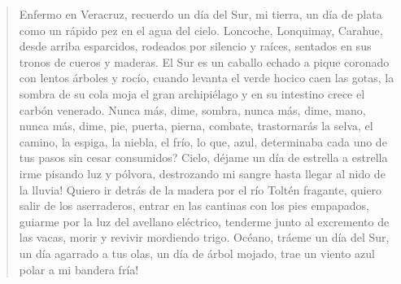 \documentclass[12pt]{article}
\begin{document}
\clearpage
{}
\begin{verse}
Enfermo en Veracruz, recuerdo un día
del Sur, mi tierra, un día de plata
como un rápido pez en el agua del cielo.
Loncoche, Lonquimay, Carahue, desde arriba
esparcidos, rodeados por silencio y raíces,
sentados en sus tronos de cueros y maderas.
El Sur es un caballo echado a pique
coronado con lentos árboles y rocío,
cuando levanta el verde hocico caen las gotas,
la sombra de su cola moja el gran archipiélago
y en su intestino crece el carbón venerado.
Nunca más, dime, sombra, nunca más, dime, mano,
nunca más, dime, pie, puerta, pierna, combate,
trastornarás la selva, el camino, la espiga,
la niebla, el frío, lo que, azul, determinaba
cada uno de tus pasos sin cesar consumidos?
Cielo, déjame un día de estrella a estrella irme
pisando luz y pólvora, destrozando mi sangre
hasta llegar al nido de la lluvia!
	 Quiero ir
detrás de la madera por el río
Toltén fragante, quiero salir de los aserraderos,
entrar en las cantinas con los pies empapados,
guiarme por la luz del avellano eléctrico,
tenderme junto al excremento de las vacas,
morir y revivir mordiendo trigo.
	 Océano, tráeme
un día del Sur, un día agarrado a tus olas,
un día de árbol mojado, trae un viento
azul polar a mi bandera fría!
\end{verse}
\end{document}
